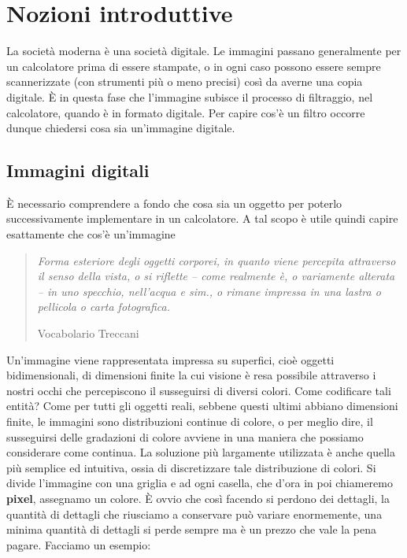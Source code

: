 \newpage
\section{Nozioni introduttive}
La società moderna è una società digitale. Le immagini passano generalmente per un calcolatore prima di essere stampate, o in ogni caso possono essere sempre scannerizzate (con strumenti più o meno precisi) così da averne una copia digitale.
\`E in questa fase che l'immagine subisce il processo di filtraggio, nel calcolatore, quando è in formato digitale. Per capire cos'è un filtro occorre dunque chiedersi cosa sia un'immagine digitale.

\subsection{Immagini digitali}
\`E necessario comprendere a fondo che cosa sia un oggetto per poterlo successivamente implementare in un calcolatore. A tal scopo è utile quindi capire esattamente che cos'è un'immagine

\begin{quote}
\epigraph{\textit{Forma esteriore degli oggetti corporei, in quanto viene percepita attraverso il senso della vista, o si riflette – come realmente è, o variamente alterata – in uno specchio, nell’acqua e sim., o rimane impressa in una lastra o pellicola o carta fotografica.}}{Vocabolario Treccani}
\end{quote}

\noindent
Un'immagine viene rappresentata impressa su superfici, cioè oggetti bidimensionali, di dimensioni finite la cui visione è resa possibile attraverso i nostri occhi che percepiscono il susseguirsi di diversi colori. Come codificare tali entità?
Come per tutti gli oggetti reali, sebbene questi ultimi abbiano dimensioni finite, le immagini sono distribuzioni continue di colore, o per meglio dire, il susseguirsi delle gradazioni di colore avviene in una maniera che possiamo considerare come continua. La soluzione più largamente utilizzata è anche quella più semplice ed intuitiva, ossia di discretizzare tale distribuzione di colori. Si divide l'immagine con una griglia e ad ogni casella, che d'ora in poi chiameremo \textbf{pixel}, assegnamo un colore.
\`E ovvio che così facendo si perdono dei dettagli, la quantità di dettagli che riusciamo a conservare può variare enormemente, una minima quantità di dettagli si perde sempre ma è un prezzo che vale la pena pagare.
\newpage
Facciamo un esempio:

